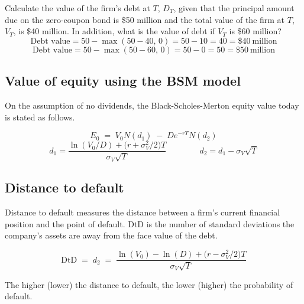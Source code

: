 \begin{crexbox}
Calculate the value of the firm's debt at $T$, $D_T$, given that the principal
amount due on the zero-coupon bond is \$50 million and the total value of the firm
at $T$, $V_T$, is \$40 million. In addition, what is the value of debt if $V_T$ is
\$60 million?
\tcblower
\[ \text{Debt value} = 50 - \max(50 - 40,\,0) = 50 - 10 = 40 = \$40\ \text{million} \]
\[ \text{Debt value} = 50 - \max(50 - 60,\,0) = 50 - 0 = 50 = \$50\ \text{million} \]
\end{crexbox}

\subsection*{Value of equity using the BSM model}

On the assumption of no dividends, the Black-Scholes-Merton equity value today is
stated as follows.

\begin{crfmlbox}
\[ E_0 \;=\; V_0 N(d_1) \;-\; D e^{-rT} N(d_2) \]
\[ d_1 = \frac{\ln(V_0/D) + \bigl(r + \sigma_V^{2}/2\bigr)T}{\sigma_V\sqrt{T}}
   \qquad\qquad
   d_2 = d_1 - \sigma_V\sqrt{T} \]
\end{crfmlbox}

\subsection*{Distance to default}

Distance to default measures the distance between a firm's current financial
position and the point of default. DtD is the number of standard deviations the
company's assets are away from the face value of the debt.

\begin{crfmlbox}
\[ \mathrm{DtD} \;=\; d_2 \;=\;
   \frac{\ln(V_0) - \ln(D) + \bigl(r - \sigma_V^{2}/2\bigr)T}{\sigma_V\sqrt{T}} \]
\end{crfmlbox}

\begin{crkeybox}[Direction]
The higher (lower) the distance to default, the lower (higher) the probability of
default.
\end{crkeybox}

